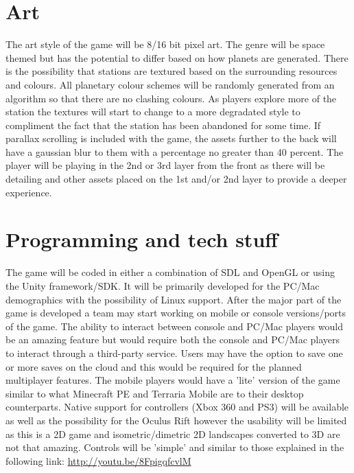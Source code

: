 \documentclass[12pt]{article}
\begin{document}
\section{Art}
The art style of the game will be 8/16 bit pixel art. The genre will be space themed but has the potential to differ based on how planets are generated. There is the possibility that stations are textured based on the surrounding resources and colours. All planetary colour schemes will be randomly generated from an algorithm so that there are no clashing colours. As players explore more of the station the textures will start to change to a more degradated style to compliment the fact that the station has been abandoned for some time. If parallax scrolling is included with the game, the assets further to the back will have a gaussian blur to them with a percentage no greater than 40 percent. The player will be playing in the 2nd or 3rd layer from the front as there will be detailing and other assets placed on the 1st and/or 2nd layer to provide a deeper experience.
\section{Programming and tech stuff}
The game will be coded in either a combination of SDL and OpenGL or using the Unity framework/SDK. It will be primarily developed for the PC/Mac demographics with the possibility of Linux support. After the major part of the game is developed a team may start working on mobile or console versions/ports of the game. The ability to interact between console and PC/Mac players would be an amazing feature but would require both the console and PC/Mac players to interact through a third-party service. Users may have the option to save one or more saves on the cloud and this would be required for the planned multiplayer features. The mobile players would have a 'lite' version of the game similar to what Minecraft PE and Terraria Mobile are to their desktop counterparts. Native support for controllers (Xbox 360 and PS3) will be available as well as the possibility for the Oculus Rift however the usability will be limited as this is a 2D game and isometric/dimetric 2D landscapes converted to 3D are not that amazing. Controls will be 'simple' and similar to those explained in the following link:
	\url{http://youtu.be/8FpigqfcvlM}
\end{document}
